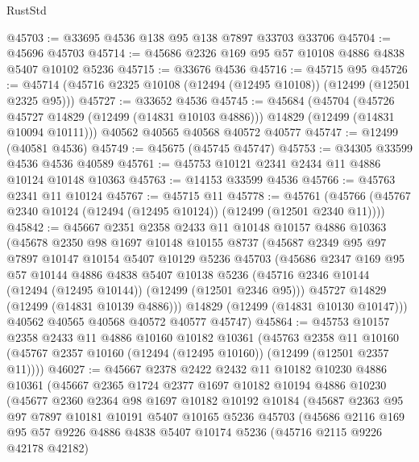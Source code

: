 \begin{lexlean}{RustStd}
\begin{coremodule}
{\begin{coremodule}
{{{{{{{{{{{{{{{{{{{{{{{{{{{{{{{{{{{{{{{{{{{{{{{{{{{{{{{{{{{{{{{{{{{{{{{{{{{{{{{{@45703 := @33695 @4536 @138 @95 @138 @7897 @33703 @33706
@45704 := @45696 @45703
@45714 := @45686 @2326 @169 @95 @57 @10108 @4886 @4838 @5407 @10102 @5236
@45715 := @33676 @4536
@45716 := @45715 @95
@45726 := @45714 (@45716 @2325 @10108 (@12494 (@12495 @10108)) (@12499 (@12501 @2325 @95)))
@45727 := @33652 @4536
@45745 := @45684
    (@45704
      (@45726 @45727 @14829 (@12499 (@14831 @10103 @4886)))
      @14829
      (@12499 (@14831 @10094 @10111)))
    @40562
    @40565
    @40568
    @40572
    @40577
@45747 := @12499 (@40581 @4536)
@45749 := @45675 (@45745 @45747)
@45753 := @34305 @33599 @4536 @4536 @40589
@45761 := @45753 @10121 @2341 @2434 @11 @4886 @10124 @10148 @10363
@45763 := @14153 @33599 @4536
@45766 := @45763 @2341 @11 @10124
@45767 := @45715 @11
@45778 := @45761 (@45766 (@45767 @2340 @10124 (@12494 (@12495 @10124)) (@12499 (@12501 @2340 @11))))
@45842 := @45667
    @2351
    @2358
    @2433
    @11
    @10148
    @10157
    @4886
    @10363
    (@45678
      @2350
      @98
      @1697
      @10148
      @10155
      @8737
      (@45687
        @2349
        @95
        @97
        @7897
        @10147
        @10154
        @5407
        @10129
        @5236
        @45703
        (@45686
          @2347
          @169
          @95
          @57
          @10144
          @4886
          @4838
          @5407
          @10138
          @5236
          (@45716 @2346 @10144 (@12494 (@12495 @10144)) (@12499 (@12501 @2346 @95)))
          @45727
          @14829
          (@12499 (@14831 @10139 @4886)))
        @14829
        (@12499 (@14831 @10130 @10147)))
      @40562
      @40565
      @40568
      @40572
      @40577
      @45747)
@45864 := @45753
    @10157
    @2358
    @2433
    @11
    @4886
    @10160
    @10182
    @10361
    (@45763
      @2358
      @11
      @10160
      (@45767 @2357 @10160 (@12494 (@12495 @10160)) (@12499 (@12501 @2357 @11))))
@46027 := @45667
    @2378
    @2422
    @2432
    @11
    @10182
    @10230
    @4886
    @10361
    (@45667
      @2365
      @1724
      @2377
      @1697
      @10182
      @10194
      @4886
      @10230
      (@45677
        @2360
        @2364
        @98
        @1697
        @10182
        @10192
        @10184
        (@45687
          @2363
          @95
          @97
          @7897
          @10181
          @10191
          @5407
          @10165
          @5236
          @45703
          (@45686
            @2116
            @169
            @95
            @57
            @9226
            @4886
            @4838
            @5407
            @10174
            @5236
            (@45716 @2115 @9226 @42178 @42182)
}}}}}}}}}}}}}}}}}}}}}}}}}}}}}}}}}}}}}}}}}}}}}}}}}}}}}}}}}}}}}}}}}}}}}}}}}}}}}}}}
\end{coremodule}}
\end{coremodule}
\end{lexlean}
